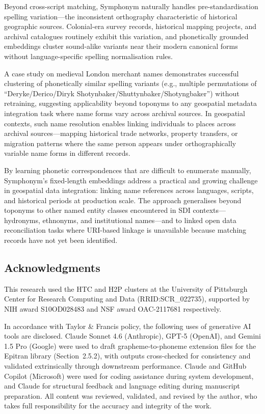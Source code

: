 \documentclass[11pt,a4paper]{article}
\begin{document}
Beyond cross-script matching, Symphonym naturally handles pre-standardisation spelling variation---the inconsistent orthography characteristic of historical geographic sources. Colonial-era survey records, historical mapping projects, and archival catalogues routinely exhibit this variation, and phonetically grounded embeddings cluster sound-alike variants near their modern canonical forms without language-specific spelling normalisation rules.

A case study on medieval London merchant names demonstrates successful clustering of phonetically similar spelling variants (e.g., multiple permutations of ``Deryke/Derico/Diryk Shotynbaker/Shuttynbaker/Shotyngbaker'') without retraining, suggesting applicability beyond toponyms to any geospatial metadata integration task where name forms vary across archival sources. In geospatial contexts, such name resolution enables linking individuals to places across archival sources—mapping historical trade networks, property transfers, or migration patterns where the same person appears under orthographically variable name forms in different records.

By learning phonetic correspondences that are difficult to enumerate manually, Symphonym's fixed-length embeddings address a practical and growing challenge in geospatial data integration: linking name references across languages, scripts, and historical periods at production scale. The approach generalises beyond toponyms to other named entity classes encountered in SDI contexts---hydronyms, ethnonyms, and institutional names---and to linked open data reconciliation tasks where URI-based linkage is unavailable because matching records have not yet been identified.

\subsection*{Acknowledgments}

This research used the HTC and H2P clusters at the University of Pittsburgh Center for Research Computing and Data (RRID:SCR\_022735), supported by NIH award S10OD028483 and NSF award OAC-2117681 respectively.

In accordance with Taylor \& Francis policy, the following uses of generative AI tools are disclosed. Claude Sonnet 4.6 (Anthropic), GPT-5 (OpenAI), and Gemini 1.5 Pro (Google) were used to draft grapheme-to-phoneme extension files for the Epitran library (Section~2.5.2), with outputs cross-checked for consistency and validated extrinsically through downstream performance. Claude and GitHub Copilot (Microsoft) were used for coding assistance during system development, and Claude for structural feedback and language editing during manuscript preparation. All content was reviewed, validated, and revised by the author, who takes full responsibility for the accuracy and integrity of the work.
\end{document}
